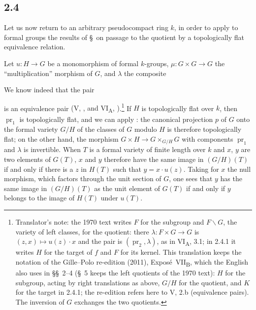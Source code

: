 
\subsection*{2.4}
\label{sga3:VIIB:2.4}

Let us now return to an arbitrary pseudocompact ring \(k\), in order to
apply to formal groups the results of \S\, on passage to the
quotient by a topologically flat equivalence relation.

Let \(u:H\to G\) be a monomorphism of formal \(k\)-groups,
\(\mu:G\times G\to G\) the ``multiplication'' morphism of \(G\), and
\(\lambda\) the composite
\begin{center}
  \label{sga3:VIIB:2.4:lambda-composite}
  
\end{center}
We know indeed that the pair
\begin{center}
  \label{sga3:VIIB:2.4:equivalence-pair}
  
\end{center}
is an equivalence pair \textup{(V, , and
VI\textsubscript{A}, )}.\footnote{Translator's note: the 1970 text writes \(F\) for
the subgroup and \(F\backslash G\), the variety of left classes, for the
quotient: there \(\lambda:F\times G\to G\) is \((z,x)\mapsto u(z)\cdot x\) and
the pair is \((\operatorname{pr}_2,\lambda)\), as in VI\textsubscript{A}, 3.1; in
2.4.1 it writes \(H\) for the target of \(f\) and \(F\) for its kernel. This
translation keeps the notation of the Gille--Polo re-edition (2011),
Exposé~VII\textsubscript{B}, which the English also uses in \S\S~2--4 (\S~5 keeps the left quotients of the 1970 text): \(H\) for the
subgroup, acting by right translations as above, \(G/H\) for the quotient,
and \(K\) for the target in 2.4.1; the re-edition refers here to V, 2.b
(equivalence pairs). The inversion of \(G\) exchanges the two quotients.}
\label{sga3:VIIB:2.4:theorem}%
If \(H\) is topologically flat over \(k\), then
\(\operatorname{pr}_1\) is topologically flat, and we can apply
: the canonical projection \(p\) of \(G\) onto the
formal variety \(G/H\) of the classes of \(G\) modulo \(H\) is therefore
topologically flat; on the other hand, the morphism
\(G\times H\to G\times_{G/H}G\) with components
\(\operatorname{pr}_1\) and \(\lambda\) is invertible. When \(T\) is a
formal variety of finite length over \(k\) and \(x\), \(y\) are two
elements of \(G(T)\), \(x\) and \(y\) therefore have the same image in
\((G/H)(T)\) if and only if there is a \(z\) in \(H(T)\) such that
\(y=x\cdot u(z)\). Taking for \(x\) the null morphism, which factors
through the unit section of \(G\), one sees that \(y\) has the same
image in \((G/H)(T)\) as the unit element of \(G(T)\) if and only if
\(y\) belongs to the image of \(H(T)\) under \(u(T)\).


